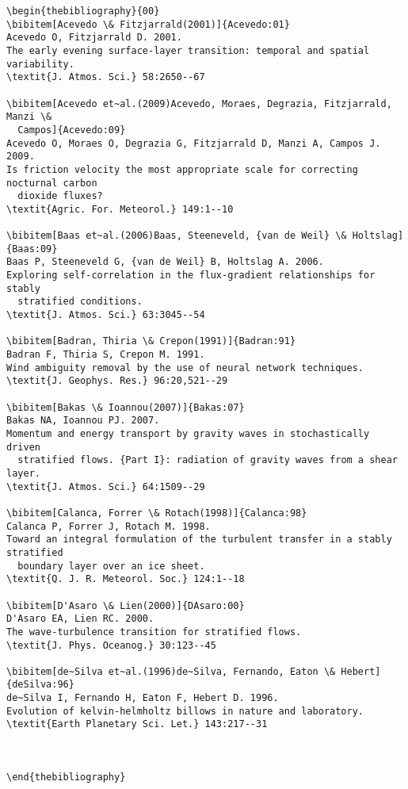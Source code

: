 \documentclass{style/ar-1col}
\begin{document}
\begin{verbatim}
\begin{thebibliography}{00}
\bibitem[Acevedo \& Fitzjarrald(2001)]{Acevedo:01}
Acevedo O, Fitzjarrald D. 2001.
The early evening surface-layer transition: temporal and spatial variability.
\textit{J. Atmos. Sci.} 58:2650--67

\bibitem[Acevedo et~al.(2009)Acevedo, Moraes, Degrazia, Fitzjarrald, Manzi \&
  Campos]{Acevedo:09}
Acevedo O, Moraes O, Degrazia G, Fitzjarrald D, Manzi A, Campos J. 2009.
Is friction velocity the most appropriate scale for correcting nocturnal carbon
  dioxide fluxes?
\textit{Agric. For. Meteorol.} 149:1--10

\bibitem[Baas et~al.(2006)Baas, Steeneveld, {van de Weil} \& Holtslag]{Baas:09}
Baas P, Steeneveld G, {van de Weil} B, Holtslag A. 2006.
Exploring self-correlation in the flux-gradient relationships for stably
  stratified conditions.
\textit{J. Atmos. Sci.} 63:3045--54

\bibitem[Badran, Thiria \& Crepon(1991)]{Badran:91}
Badran F, Thiria S, Crepon M. 1991.
Wind ambiguity removal by the use of neural network techniques.
\textit{J. Geophys. Res.} 96:20,521--29

\bibitem[Bakas \& Ioannou(2007)]{Bakas:07}
Bakas NA, Ioannou PJ. 2007.
Momentum and energy transport by gravity waves in stochastically driven
  stratified flows. {Part I}: radiation of gravity waves from a shear layer.
\textit{J. Atmos. Sci.} 64:1509--29

\bibitem[Calanca, Forrer \& Rotach(1998)]{Calanca:98}
Calanca P, Forrer J, Rotach M. 1998.
Toward an integral formulation of the turbulent transfer in a stably stratified
  boundary layer over an ice sheet.
\textit{Q. J. R. Meteorol. Soc.} 124:1--18

\bibitem[D'Asaro \& Lien(2000)]{DAsaro:00}
D'Asaro EA, Lien RC. 2000.
The wave-turbulence transition for stratified flows.
\textit{J. Phys. Oceanog.} 30:123--45

\bibitem[de~Silva et~al.(1996)de~Silva, Fernando, Eaton \& Hebert]{deSilva:96}
de~Silva I, Fernando H, Eaton F, Hebert D. 1996.
Evolution of kelvin-helmholtz billows in nature and laboratory.
\textit{Earth Planetary Sci. Let.} 143:217--31



\end{thebibliography}
\end{verbatim}
\end{document}
